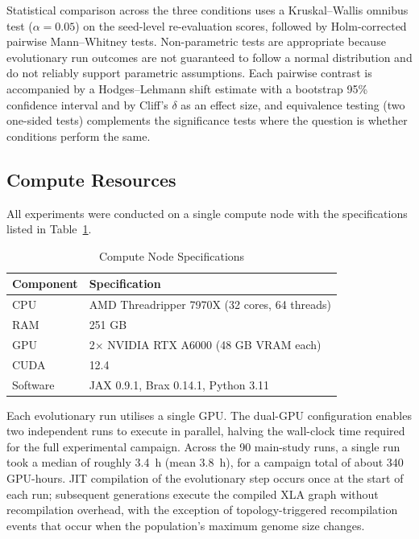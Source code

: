 \documentclass[12pt]{article}
\begin{document}
Statistical comparison across the three conditions uses a Kruskal--Wallis omnibus test ($\alpha = 0.05$) on the seed-level re-evaluation scores, followed by Holm-corrected pairwise Mann--Whitney tests.
Non-parametric tests are appropriate because evolutionary run outcomes are not guaranteed to follow a normal distribution and do not reliably support parametric assumptions.
Each pairwise contrast is accompanied by a Hodges--Lehmann shift estimate with a bootstrap 95\% confidence interval and by Cliff's $\delta$ as an effect size, and equivalence testing (two one-sided tests) complements the significance tests where the question is whether conditions perform the same.

\subsection{Compute Resources}
\label{subsec:compute-resources}

All experiments were conducted on a single compute node with the specifications listed in Table~\ref{tab:compute-node}.

\begin{table}[h]
\centering
\caption{Compute Node Specifications}
\label{tab:compute-node}
\begin{tabular}{ll}
\toprule
\textbf{Component} & \textbf{Specification} \\
\midrule
CPU & AMD Threadripper 7970X (32 cores, 64 threads) \\
RAM & 251 GB \\
GPU & 2$\times$ NVIDIA RTX A6000 (48 GB VRAM each) \\
CUDA & 12.4 \\
Software & JAX 0.9.1, Brax 0.14.1, Python 3.11 \\
\bottomrule
\end{tabular}
\end{table}

Each evolutionary run utilises a single GPU.
The dual-GPU configuration enables two independent runs to execute in parallel, halving the wall-clock time required for the full experimental campaign.
Across the 90 main-study runs, a single run took a median of roughly 3.4~h (mean 3.8~h), for a campaign total of about 340 GPU-hours.
JIT compilation of the evolutionary step occurs once at the start of each run; subsequent generations execute the compiled XLA graph without recompilation overhead, with the exception of topology-triggered recompilation events that occur when the population's maximum genome size changes.
\end{document}
